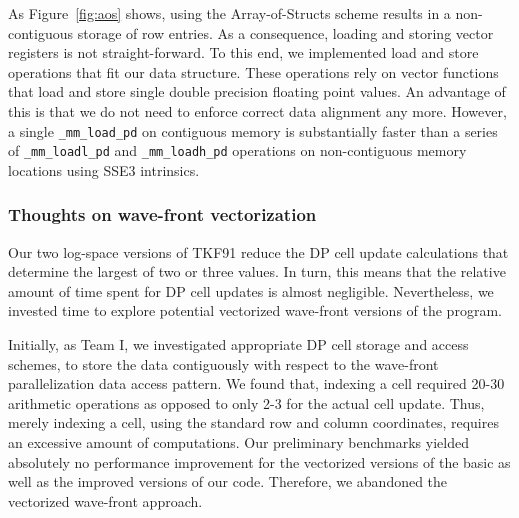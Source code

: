\documentclass[runningheads,a4paper]{llncs}
\begin{document}
As Figure~\ref{fig:aos} shows, using the Array-of-Structs scheme results in a non-contiguous storage of row entries.
As a consequence, loading and storing vector registers is not straight-forward.
To this end, we implemented load and store operations that fit our data structure.
These operations rely on vector functions that load and store single double precision floating point values.
An advantage of this is that we do not need to enforce correct data alignment any more.
However, a single  \texttt{\_mm\_load\_pd} on contiguous memory is substantially faster than a series of \texttt{\_mm\_loadl\_pd} and \texttt{\_mm\_loadh\_pd} operations
on non-contiguous memory locations using SSE3 intrinsics. 

\subsubsection{Thoughts on wave-front vectorization}


Our two log-space versions of TKF91 reduce the DP cell update calculations that determine the largest of two or three values.
In turn, this means that the relative amount of time spent for DP cell updates is almost negligible.
Nevertheless, we invested time to explore potential vectorized wave-front versions of the program.

Initially, as Team I, we investigated appropriate DP cell storage and access schemes,
to store the data contiguously with respect to the wave-front parallelization data access pattern.
We found that, indexing a cell required 20-30 arithmetic operations as opposed to only 2-3 for the actual cell update.
Thus, merely indexing a cell, using the standard row and column coordinates, requires an excessive amount of computations.
Our preliminary benchmarks yielded absolutely no performance improvement for the vectorized versions of
the basic as well as the improved versions of our code.
Therefore, we abandoned the vectorized wave-front approach.
\end{document}
